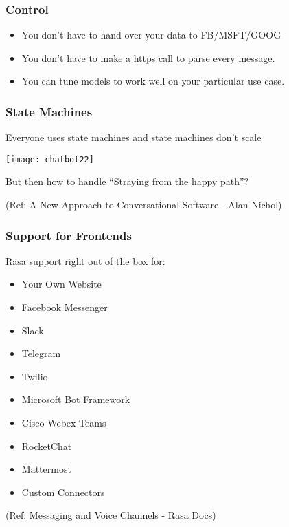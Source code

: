  \begin{frame}[fragile]\frametitle{Control}
\begin{itemize}
\item You don't have to hand over your data to FB/MSFT/GOOG
\item You don't have to make a https call to parse every message.
\item You can tune models to work well on your particular use case.
\end{itemize}
\end{frame}


 \begin{frame}[fragile]\frametitle{State Machines}
Everyone uses state machines and state machines don't scale


\begin{center}
\texttt{[image: chatbot22]}

\end{center}

But then how to handle ``Straying from the happy path''?

{\tiny (Ref: A New Approach to Conversational Software - Alan Nichol)}
\end{frame}

 \begin{frame}[fragile]\frametitle{Support for Frontends}
 Rasa support right out of the box for:
 \begin{itemize}
\item Your Own Website
\item Facebook Messenger
\item Slack
\item Telegram
\item Twilio
\item Microsoft Bot Framework
\item Cisco Webex Teams
\item RocketChat
\item Mattermost
\item Custom Connectors
\end{itemize}

{\tiny (Ref: Messaging and Voice Channels - Rasa Docs)}

\end{frame}

